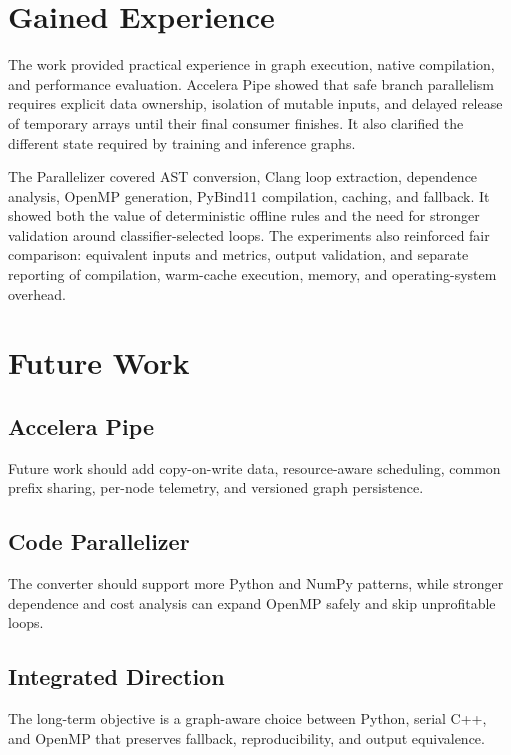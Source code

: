 \documentclass[12pt,a4paper,oneside]{report}
\begin{document}
\section{Gained Experience}

The work provided practical experience in graph execution, native compilation,
and performance evaluation. Accelera Pipe showed that safe branch parallelism
requires explicit data ownership, isolation of mutable inputs, and delayed
release of temporary arrays until their final consumer finishes. It also
clarified the different state required by training and inference graphs.

The Parallelizer covered AST conversion, Clang loop extraction, dependence
analysis, OpenMP generation, PyBind11 compilation, caching, and fallback. It
showed both the value of deterministic offline rules and the need for stronger
validation around classifier-selected loops. The experiments also reinforced fair comparison: equivalent
inputs and metrics, output validation, and separate reporting of compilation,
warm-cache execution, memory, and operating-system overhead.

\section{Future Work}

\subsection{Accelera Pipe}
Future work should add copy-on-write data, resource-aware scheduling, common
prefix sharing, per-node telemetry, and versioned graph persistence.

\subsection{Code Parallelizer}
The converter should support more Python and NumPy patterns, while stronger
dependence and cost analysis can expand OpenMP safely and skip unprofitable loops.

\subsection{Integrated Direction}
The long-term objective is a graph-aware choice between Python, serial C++, and
OpenMP that preserves fallback, reproducibility, and output equivalence.

\end{document}
